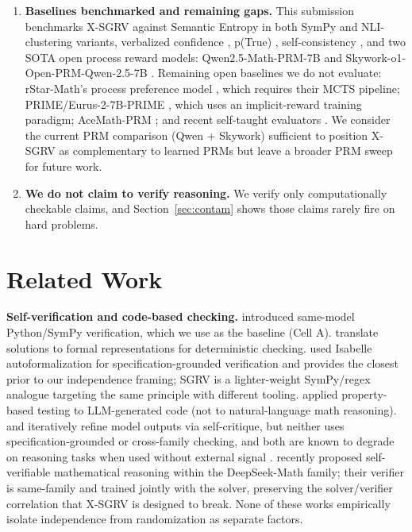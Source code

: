\documentclass{article}
\begin{document}
\begin{enumerate}[leftmargin=*,itemsep=1pt]
\item \textbf{Baselines benchmarked and remaining gaps.} This submission benchmarks X-SGRV against Semantic Entropy in both SymPy \citep{kuhn2023semantic} and NLI-clustering \citep{farquhar2024nature} variants, verbalized confidence \citep{xiong2024llmuncertainty}, p(True) \citep{kadavath2022}, self-consistency \citep{wang2023selfconsistency}, and two SOTA open process reward models: Qwen2.5-Math-PRM-7B \citep{qwenprm2025} and Skywork-o1-Open-PRM-Qwen-2.5-7B \citep{skyworkprm2024}. Remaining open baselines we do not evaluate: rStar-Math's process preference model \citep{rstarmath2025}, which requires their MCTS pipeline; PRIME/Eurus-2-7B-PRIME \citep{prime2025}, which uses an implicit-reward training paradigm; AceMath-PRM \citep{acemath2024}; and recent self-taught evaluators \citep{ste2024}. We consider the current PRM comparison (Qwen + Skywork) sufficient to position X-SGRV as complementary to learned PRMs but leave a broader PRM sweep for future work.
\item \textbf{We do not claim to verify reasoning.} We verify only computationally checkable claims, and Section~\ref{sec:contam} shows those claims rarely fire on hard problems.
\end{enumerate}

\section{Related Work}
\label{sec:related}

\sloppy

\textbf{Self-verification and code-based checking.} \citet{exever} introduced same-model Python/SymPy verification, which we use as the baseline (Cell A). \citet{symcode2024, mathvf2025} translate solutions to formal representations for deterministic checking. \citet{dtv2024} used Isabelle autoformalization for specification-grounded verification and provides the closest prior to our independence framing; SGRV is a lighter-weight SymPy/regex analogue targeting the same principle with different tooling. \citet{pgs2025} applied property-based testing to LLM-generated code (not to natural-language math reasoning). \citet{selfrefine2023} and \citet{selfdebug2024} iteratively refine model outputs via self-critique, but neither uses specification-grounded or cross-family checking, and both are known to degrade on reasoning tasks when used without external signal \citep{huang2024selfcorrect}. \citet{deepseekmathv2} recently proposed self-verifiable mathematical reasoning within the DeepSeek-Math family; their verifier is same-family and trained jointly with the solver, preserving the solver/verifier correlation that X-SGRV is designed to break. None of these works empirically isolate independence from randomization as separate factors.
\end{document}
